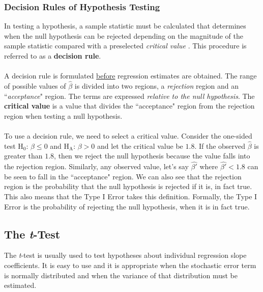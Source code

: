 \documentclass[11pt]{article}
\begin{document}
\subsubsection{Decision Rules of Hypothesis Testing}
In testing a hypothesis, a sample statistic must be calculated that determines when the null hypothesis can be rejected depending on the magnitude of the sample statistic compared with a preselected \textit{critical value} . This procedure is referred to as a \textbf{decision rule}.\\ \\
A decision rule is formulated \underline{before} regression estimates are obtained. The range of possible values of $\hat{\beta}$ is divided into two regions, a \textit{rejection} region and an ``\textit{acceptance}" region. The terms are expressed \textit{relative to the null hypothesis}. The \textbf{critical value} is a value that divides the ``acceptance" region from the rejection region when testing a null hypothesis.\\ \\
To use a decision rule, we need to select a critical value. Consider the one-sided test  $\text{H}_0\text{: }\beta \leq 0$ and $\text{H}_\text{A}\text{: } \beta > 0$ and let the critical value be $1.8$. If the observed $\hat{\beta}$ is greater than $1.8$, then we reject the null hypothesis because the value falls into the rejection region. Similarly, any observed value, let's say $\hat{\beta'}$ where $\hat{\beta'} < 1.8$ can be seen to fall in the ``acceptance" region. We can also see that the rejection region is the probability that the null hypothesis is rejected if it is, in fact true. This also means that the Type I Error takes this definition. Formally, the Type I Error is the probability of rejecting the null hypothesis, when it is in fact true.
\subsection{The \textit{t}-Test}
The \textit{t}-test is usually used to test hypotheses about individual regression slope coefficients. It is easy to use and it is appropriate when the stochastic error term is normally distributed and when the variance of that distribution must be estimated.
\end{document}
